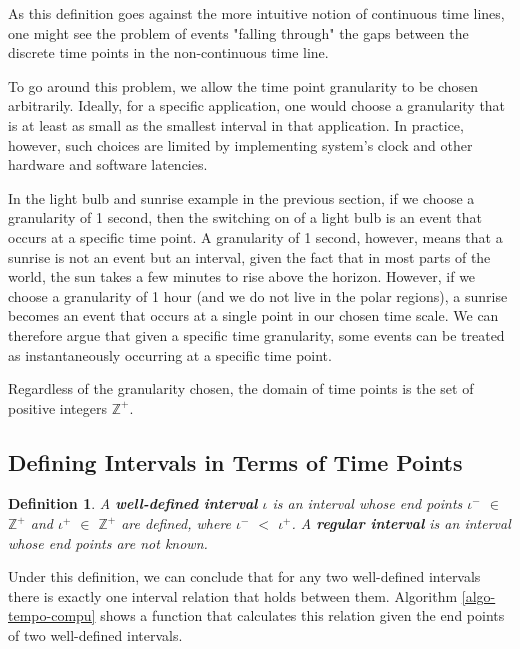 \documentclass[11pt]{report}
\newtheorem{vdefinition}{Definition}[chapter]
\begin{document}
        As this definition goes against the more intuitive notion of continuous
        time lines, one might see the problem of events "falling through" the
        gaps between the discrete time points in the non-continuous time line.

        To go around this problem, we allow the time point granularity to be
        chosen arbitrarily. Ideally, for a specific application, one would
        choose a granularity that is at least as small as the smallest interval
        in that application. In practice, however, such choices are limited by
        implementing system's clock and other hardware and software latencies.

        In the light bulb and sunrise example in the previous section, if we
        choose a granularity of 1 second, then the switching on of a light bulb
        is an event that occurs at a specific time point. A granularity of 1
        second, however, means that a sunrise is not an event but an interval,
        given the fact that in most parts of the world, the sun takes a few
        minutes to rise above the horizon. However, if we choose a granularity
        of 1 hour (and we do not live in the polar regions), a sunrise becomes
        an event that occurs at a single point in our chosen time scale. We can
        therefore argue that given a specific time granularity, some events can
        be treated as instantaneously occurring at a specific time point.

        Regardless of the granularity chosen, the domain of time points is the
        set of positive integers ${\mathbb Z}^{+}$.

      \subsection{Defining Intervals in Terms of Time Points}
        \label{subs-tempo-inttp}

        \begin{vdefinition}
          \label{defn-tempo-intvl}
          A {\bf well-defined interval} $\iota$ is an interval whose end points
          $\iota^{-}$ $\in$ ${\mathbb Z}^{+}$ and $\iota^{+}$ $\in$
          ${\mathbb Z}^{+}$ are defined, where $\iota^{-}$ $<$ $\iota^{+}$. A
          {\bf regular interval} is an interval whose end points are not known.
        \end{vdefinition}

        Under this definition, we can conclude that for any two well-defined
        intervals there is exactly one interval relation that holds between
        them. Algorithm \ref{algo-tempo-compu} shows a function that calculates
        this relation given the end points of two well-defined intervals.
\end{document}
